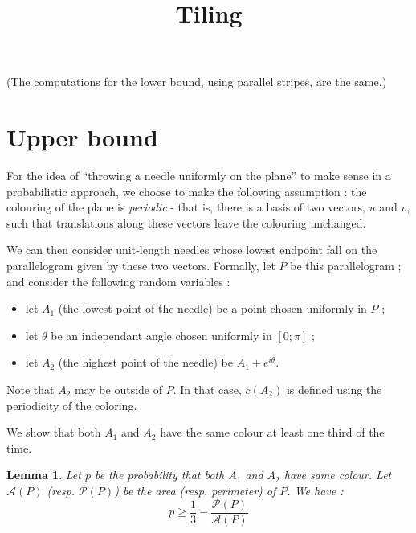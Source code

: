 \documentclass[a4paper,11pt]{article}
\title{Tiling}
\newtheorem{lemma}{Lemma}
\begin{document}
(The computations for the lower bound, using parallel stripes, are the same.)

\section{Upper bound}


For the idea of ``throwing a needle uniformly on the plane'' to make sense in a probabilistic approach, we choose to make the following assumption : 
the colouring of the plane is \textit{periodic} - that is, there is a basis of two vectors, $u$ and $v$, such that translations along these vectors leave the colouring unchanged.

We can then consider unit-length needles whose lowest endpoint fall on the parallelogram given by these two vectors.
Formally, let $P$ be this parallelogram ; and consider the following random variables :
\begin{itemize}
  \item let $A_1$ (the lowest point of the needle) be a point chosen uniformly in $P$ ;
  \item let $\theta$ be an independant angle chosen uniformly in $[0;\pi]$ ;
  \item let $A_2$ (the highest point of the needle) be $A_1 + e^{i \theta}$.
\end{itemize}

Note that $A_2$ may be outside of $P$. In that case, $c(A_2)$ is defined using the periodicity of the coloring.

We show that both $A_1$ and $A_2$ have the same colour at least one third of the time.

\begin{lemma}
 Let $p$ be the probability that both $A_1$ and $A_2$ have same colour. Let $\mathcal{A}(P)$ (resp. $\mathcal{P}(P)$) be the area (resp. perimeter) of $P$. We have :
 \[p \geq \frac{1}{3} - \frac{\mathcal{P}(P)}{\mathcal{A}(P)} \]
\end{lemma}
\end{document}

